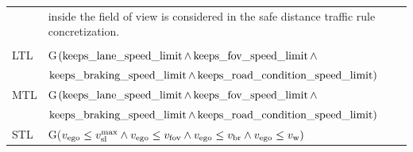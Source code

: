 \begin{table}[H]
\begin{tabular}[t]{ll}
	& inside the field of view is considered in the safe distance traffic rule concretization.\\
	&\\
	LTL & G$(\operatorname*{keeps\_lane\_speed\_limit} \land \operatorname*{keeps\_fov\_speed\_limit} \land$ \\
	& $\operatorname*{keeps\_braking\_speed\_limit} \land \operatorname*{keeps\_road\_condition\_speed\_limit})$\\
	MTL & G$(\operatorname*{keeps\_lane\_speed\_limit} \land \operatorname*{keeps\_fov\_speed\_limit} \land$\\
	& $\operatorname*{keeps\_braking\_speed\_limit} \land \operatorname*{keeps\_road\_condition\_speed\_limit})$\\
	STL & G($v_\text{ego} \leq v_\text{sl}^\text{max} \land v_\text{ego} \leq v_\text{fov} \land v_\text{ego} \leq v_\text{br} \land v_\text{ego} \leq v_\text{w})$\\ 
\bottomrule
\end{tabular}
\end{table}

